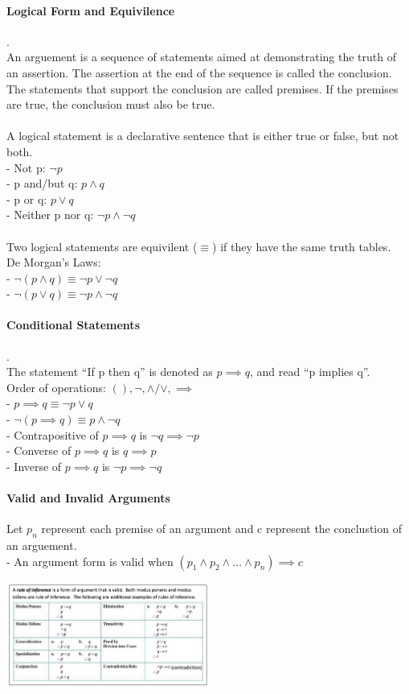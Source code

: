 \documentclass[10pt,letterpaper]{article}
\begin{document}
\begin{multicols}{2}
\paragraph*{Logical Form and Equivilence}.\\
An arguement is a sequence of statements aimed at demonstrating the truth of an assertion. The assertion at the end of the sequence is called the conclusion.
The statements that support the conclusion are called premises. If the premises are true, the conclusion must also be true.\\
\\
A logical statement is a declarative sentence that is either true or false, but not both.\\
- Not p: $\neg p$\\
- p and/but q: $p \land q$\\ 
- p or q: $p \lor q$\\
- Neither p nor q: $\neg p \land \neg q$\\
\\
Two logical statements are equivilent ($\equiv$) if they have the same truth tables.\\
De Morgan's Laws:\\
- $\neg(p \land q) \equiv \neg p \lor \neg q$\\
- $\neg(p \lor q) \equiv \neg p \land \neg q$

\paragraph*{Conditional Statements}.\\
The statement ``If p then q'' is denoted as $p \implies q$, and read ``p implies q''.\\
Order of operations: $(), \neg, \land/\lor, \implies$\\
- $p \implies q \equiv \neg p \lor q$\\
- $\neg (p \implies q) \equiv p \land \neg q$\\
- Contrapositive of $p \implies q$ is $\neg q \implies \neg p$\\
- Converse of $p \implies q$ is $q \implies p$\\
- Inverse of $p \implies q$ is $\neg p \implies \neg q$

\paragraph*{Valid and Invalid Arguments} Let $p_n$ represent each premise of an argument and c represent the conclustion of an arguement.\\
- An argument form is valid when $(p_1 \land p_2 \land \dots \land p_n) \implies c$
\begin{center}
    \includegraphics[width=0.5\textwidth]{rule-of-inference.png}
\end{center}


\end{multicols}
\end{document}
